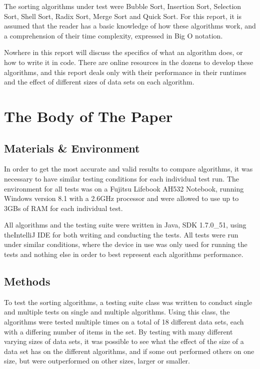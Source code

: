 \documentclass{acm_proc_article-sp}
\begin{document}
The sorting algorithms under test were Bubble Sort, Insertion Sort,
Selection Sort, Shell Sort, Radix Sort, Merge Sort and Quick Sort. For this
report, it is assumed that the reader has a basic knowledge of how these
algorithms work, and a comprehension of their time complexity\cite{complexity}, expressed
in Big O\cite{bigo} notation.

Nowhere in this report will discuss the specifics of what
an algorithm does, or how to write it in code. There are online
resources in the dozens to develop these algorithms, and this report
deals only with their performance in their runtimes and the effect of
different sizes of data sets on each algorithm.


\section{The {\secit Body} of The Paper}

\subsection{Materials \& Environment}
In order to get the most accurate and valid results to compare algorithms,
it was necessary to have similar testing conditions for each individual test run.
The environment for all tests was on a Fujitsu Lifebook AH532 Notebook,
running Windows version 8.1 with a 2.6GHz processor and were allowed 
to use up to 3GBs of RAM for each individual test.

All algorithms and the 
testing suite were written in Java, SDK 1.7.0\_51, using 
theIntelliJ IDE for both writing and conducting the tests. All tests were
run under similar conditions, where the device in use was only used for
running the tests and nothing else in order to best
represent each algorithms performance.


\subsection{Methods}
To test the sorting algorithms, a testing suite class was written to conduct
single and multiple tests on single and multiple algorithms. Using this class, 
the algorithms were tested multiple times on a total of 18 different data sets,
each with a differing number of items in the set. By testing with many different
varying sizes of data sets, it was possible to see what the effect of the size
of a data set has on the different algorithms, and if some out performed
others on one size, but were outperformed on other sizes, larger or smaller.
\end{document}
